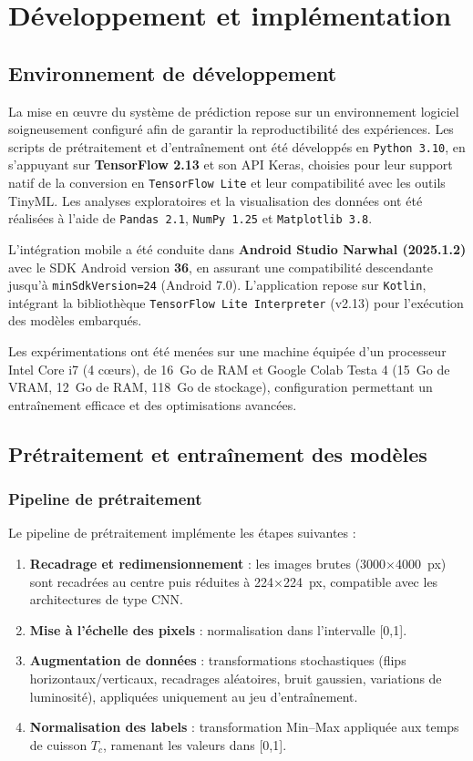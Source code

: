 \chapter{Développement et implémentation}

\section{Environnement de développement}
\label{sec:env_dev}

La mise en œuvre du système de prédiction repose sur un environnement logiciel soigneusement configuré afin de garantir la reproductibilité des expériences. Les scripts de prétraitement et d’entraînement ont été développés en \texttt{Python 3.10}, en s’appuyant sur \textbf{TensorFlow 2.13} et son API Keras, choisies pour leur support natif de la conversion en \texttt{TensorFlow Lite} et leur compatibilité avec les outils TinyML. Les analyses exploratoires et la visualisation des données ont été réalisées à l’aide de \texttt{Pandas 2.1}, \texttt{NumPy 1.25} et \texttt{Matplotlib 3.8}.

L’intégration mobile a été conduite dans \textbf{Android Studio Narwhal (2025.1.2)} avec le SDK Android version \textbf{36}, en assurant une compatibilité descendante jusqu’à \texttt{minSdkVersion=24} (Android 7.0). L’application repose sur \texttt{Kotlin}, intégrant la bibliothèque \texttt{TensorFlow Lite Interpreter} (v2.13) pour l’exécution des modèles embarqués.

Les expérimentations ont été menées sur une machine équipée d’un processeur Intel Core i7 (4 cœurs), de 16~Go de RAM et Google Colab Testa 4 (15~Go de VRAM, 12~Go de RAM, 118~Go de stockage), configuration permettant un entraînement efficace et des optimisations avancées.

\section{Prétraitement et entraînement des modèles}
\label{sec:preproc_train}

\subsection{Pipeline de prétraitement}
Le pipeline de prétraitement implémente les étapes suivantes :
\begin{enumerate}
\item \textbf{Recadrage et redimensionnement} : les images brutes (3000$\times$4000~px) sont recadrées au centre puis réduites à 224$\times$224~px, compatible avec les architectures de type CNN.
\item \textbf{Mise à l’échelle des pixels} : normalisation dans l’intervalle [0,1].
\item \textbf{Augmentation de données} : transformations stochastiques (flips horizontaux/verticaux, recadrages aléatoires, bruit gaussien, variations de luminosité), appliquées uniquement au jeu d’entraînement.
\item \textbf{Normalisation des labels} : transformation Min--Max appliquée aux temps de cuisson $T_c$, ramenant les valeurs dans [0,1].
\end{enumerate}

